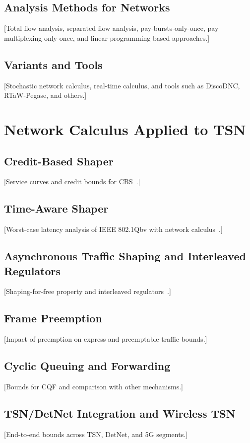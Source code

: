 \documentclass[journal]{IEEEtran}
\begin{document}
\subsection{Analysis Methods for Networks}
[Total flow analysis, separated flow analysis, pay-bursts-only-once, pay multiplexing only once, and linear-programming-based approaches.]

\subsection{Variants and Tools}
[Stochastic network calculus, real-time calculus, and tools such as DiscoDNC, RTaW-Pegase, and others.]


\section{Network Calculus Applied to TSN}
\label{sec:nc_tsn}

\subsection{Credit-Based Shaper}
[Service curves and credit bounds for CBS~\cite{mohammadpour2019cbs}.]

\subsection{Time-Aware Shaper}
[Worst-case latency analysis of IEEE 802.1Qbv with network calculus~\cite{zhao2018tas}.]

\subsection{Asynchronous Traffic Shaping and Interleaved Regulators}
[Shaping-for-free property and interleaved regulators~\cite{leboudec2018regulators}.]

\subsection{Frame Preemption}
[Impact of preemption on express and preemptable traffic bounds.]

\subsection{Cyclic Queuing and Forwarding}
[Bounds for CQF and comparison with other mechanisms.]

\subsection{TSN/DetNet Integration and Wireless TSN}
[End-to-end bounds across TSN, DetNet, and 5G segments.]
\end{document}

